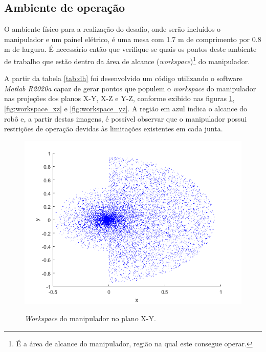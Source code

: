 \subsection{Ambiente de operação}
\label{sub:ambiente}

O ambiente físico para a realização do desafio, onde serão incluídos o manipulador e um painel elétrico, é uma mesa com 1.7 m de comprimento por 0.8 m de largura. É necessário então que verifique-se quais os pontos deste ambiente de trabalho que estão dentro da área de alcance (\textit{workspace})\footnote{É a área de alcance do manipulador, região na qual este consegue operar.} do manipulador.

A partir da tabela \ref{tab:dh} foi desenvolvido um código utilizando o software \textit{Matlab R2020a} capaz de gerar pontos que populem o \textit{workspace} do manipulador nas projeções dos planos X-Y, X-Z e Y-Z, conforme exibido nas figuras \ref{fig:workspace_xy}, \ref{fig:workspace_xz} e \ref{fig:workspace_yz}. A região em azul indica o alcance do robô e, a partir destas imagens, é possível observar que o manipulador possui restrições de operação devidas às limitações existentes em cada junta.




\begin{figure}[H]
    \caption{\textit{Workspace} do manipulador no plano X-Y.}
    \centering
    \includegraphics[scale=0.8]{images/workspace_xy.png}
    \label{fig:workspace_xy}
\end{figure}




